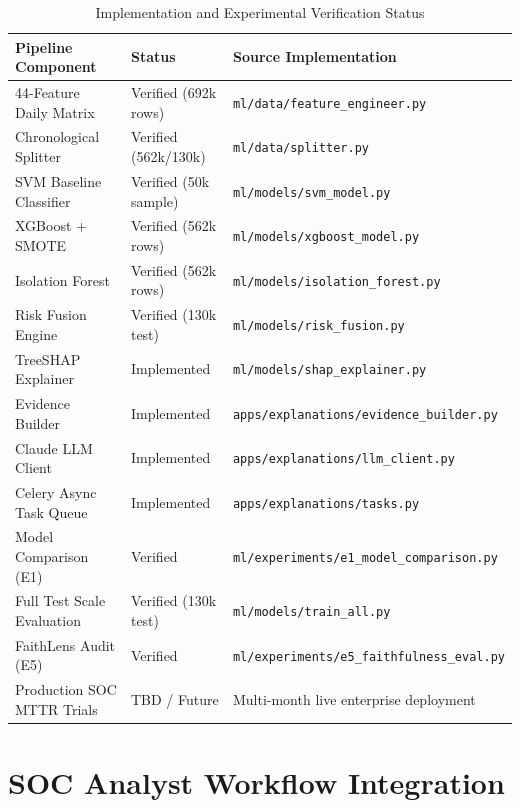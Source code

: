 \documentclass[conference]{IEEEtran}
\begin{document}
\begin{table}[htbp]
\caption{Implementation and Experimental Verification Status}
\label{tab:implementation_status}
\centering
\begin{tabular}{lll}
\toprule
\textbf{Pipeline Component} & \textbf{Status} & \textbf{Source Implementation} \\
\midrule
44-Feature Daily Matrix & Verified (692k rows) & \texttt{ml/data/feature\_engineer.py} \\
Chronological Splitter & Verified (562k/130k) & \texttt{ml/data/splitter.py} \\
SVM Baseline Classifier & Verified (50k sample) & \texttt{ml/models/svm\_model.py} \\
XGBoost + SMOTE & Verified (562k rows) & \texttt{ml/models/xgboost\_model.py} \\
Isolation Forest & Verified (562k rows) & \texttt{ml/models/isolation\_forest.py} \\
Risk Fusion Engine & Verified (130k test) & \texttt{ml/models/risk\_fusion.py} \\
TreeSHAP Explainer & Implemented & \texttt{ml/models/shap\_explainer.py} \\
Evidence Builder & Implemented & \texttt{apps/explanations/evidence\_builder.py} \\
Claude LLM Client & Implemented & \texttt{apps/explanations/llm\_client.py} \\
Celery Async Task Queue & Implemented & \texttt{apps/explanations/tasks.py} \\
Model Comparison (E1) & Verified & \texttt{ml/experiments/e1\_model\_comparison.py} \\
Full Test Scale Evaluation & Verified (130k test) & \texttt{ml/models/train\_all.py} \\
FaithLens Audit (E5) & Verified & \texttt{ml/experiments/e5\_faithfulness\_eval.py} \\
Production SOC MTTR Trials & TBD / Future & Multi-month live enterprise deployment \\
\bottomrule
\end{tabular}
\end{table}

\section{SOC Analyst Workflow Integration}
\label{sec:workflow}
\end{document}
